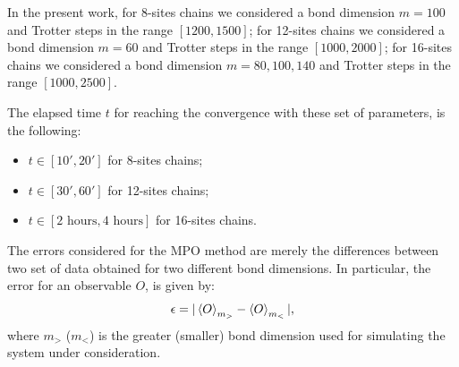 In the present work, for 8-sites chains we considered a bond dimension $m = 100$ and Trotter steps in the range $[1200, 1500]$; for 12-sites chains we considered a bond dimension $m = 60$ and Trotter steps in the range $[1000, 2000]$; for 16-sites chains we considered a bond dimension $m = 80, 100, 140$ and Trotter steps in the range $[1000, 2500]$.

The elapsed time $t$ for reaching the convergence with these set of parameters, is the following:
\begin{itemize}
    \item $t \in [10', 20']$ for 8-sites chains;
    \item $t \in [30', 60']$ for 12-sites chains;
    \item $t \in [2 \text{ hours}, 4 \text{ hours}]$ for 16-sites chains.
\end{itemize}

The errors considered for the MPO method are merely the differences between two set of data obtained for two different bond dimensions. In particular, the error for an observable $O$, is given by:
\begin{equation*}
    \epsilon = |\braket{O}_{m_>} - \braket{O}_{m_<}|,
\end{equation*}
where $m_>$ ($m_<$) is the greater (smaller) bond dimension used for simulating the system under consideration.

